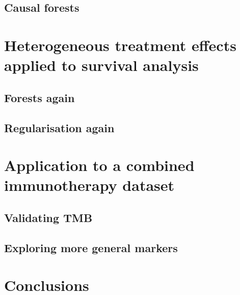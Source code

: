 \documentclass[../thesis.tex]{subfiles}
\begin{document}
\subsection{Causal forests}
\citep{athey_generalized_2019}

\section{Heterogeneous treatment effects applied to survival analysis}

\subsection{Forests again}

\subsection{Regularisation again}

\section{Application to a combined immunotherapy dataset}

\subsection{Validating TMB}

\subsection{Exploring more general markers}

\section{Conclusions}


\dobib %
\end{document}
